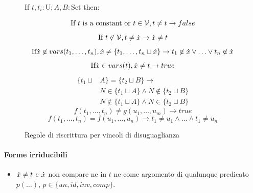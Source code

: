 \documentclass[12pt,a4paper,openright]{book} %
\begin{document}
\begin{figure}
	\begin{tcolorbox}[colframe=black, colback=white, sharp corners]
		\setcounter{equation}{0}
		\renewcommand{\theequation}{$\neq$\textsubscript{\arabic{equation}}}
		
		If $t, t_i: \text{U}; A,B: \text{Set}$ then:
		
		\begin{equation}
		\text{If } t \text{ is a constant or } t \in \mathcal{V}, t \neq t \to false
		\end{equation}
		\begin{equation}
		\text{If } t \not\in \mathcal{V}, t \neq \dot{x} \to \dot{x} \neq t
		\end{equation}
		\begin{equation}
		\text{If} \dot{x} \not\in vars(t_1, \ldots, t_n), \dot{x} \neq \{ t_1, \ldots, t_n \sqcup \dot{x} \} \to t_1 \not\in \dot{x} \lor \ldots \lor t_n \not\in \dot{x}
		\end{equation}
		\begin{equation}
		\text{If} \dot{x} \in vars(t), \dot{x} \neq t \to true
		\end{equation}
		\begin{equation}
		\begin{split}
		\{ t_1 \sqcup & A \} = \{ t_2 \sqcup B \} \to \\
		& N \in \{ t_1 \sqcup A \} \land N \not\in \{ t_2 \sqcup B \} \\
		& N \not\in \{ t_1 \sqcup A \} \land N \in \{ t_2 \sqcup B \}
		\end{split}
		\end{equation}
		\begin{equation}
		f(t_1, \ldots, t_n) \neq g(u_1, \ldots, u_m) \to true
		\end{equation}
		\begin{equation}
		f(t_1, \ldots, t_n) = f(u_1, \ldots, u_n) \to t_1 \neq u_1 \land \ldots \land t_1 \neq u_n
		\end{equation}
		
	\end{tcolorbox}
	
	\caption{Regole di riscrittura per vincoli di disuguaglianza}
	\label{fig:neq_constraints}
\end{figure}

\paragraph{Forme irriducibili}
\begin{itemize}
	\item $\dot{x} \neq t$ e $\dot{x}$ non compare ne in $t$ ne come argomento di qualunque predicato $p(\ldots)$, $p \in \{ un, id, inv, comp \}$.
\end{itemize}
\end{document}
